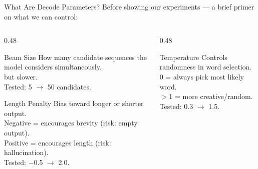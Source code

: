 
\begin{frame}{What Are Decode Parameters?}
  \vspace{2pt}
  {\small Before showing our experiments --- a brief primer on what we can control:}

  \vspace{6pt}

  \begin{columns}[T]
    \begin{column}{0.48\textwidth}
      \begin{block}{\small Beam Size}
        {\scriptsize How many candidate sequences the model considers simultaneously.\\
         but slower.\\
        Tested: 5 $\rightarrow$ 50 candidates.}
      \end{block}

      \vspace{2pt}

      \begin{block}{\small Length Penalty}
        {\scriptsize Bias toward longer or shorter output.\\
        Negative = encourages brevity (risk: empty output).\\
        Positive = encourages length (risk: hallucination).\\
        Tested: $-$0.5 $\rightarrow$ 2.0.}
      \end{block}
    \end{column}
    \begin{column}{0.48\textwidth}
      \begin{block}{\small Temperature}
        {\scriptsize Controls randomness in word selection.\\
        0 = always pick most likely word.\\
        $>$1 = more creative/random.\\
        Tested: 0.3 $\rightarrow$ 1.5.}
      \end{block}

      \vspace{2pt}


\end{column}
\end{columns}
\end{frame}
